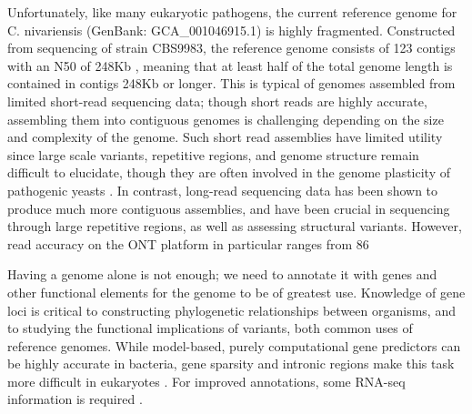 Unfortunately, like many eukaryotic pathogens, the current reference genome for C. nivariensis (GenBank: GCA\_001046915.1) is highly fragmented. Constructed from sequencing of strain CBS9983, the reference genome consists of 123 contigs with an N50 of 248Kb \citep{Gabaldon2013-bk}, meaning that at least half of the total genome length is contained in contigs 248Kb or longer. This is typical of genomes assembled from limited short-read sequencing data; though short reads are highly accurate, assembling them into contiguous genomes is challenging depending on the size and complexity of the genome. Such short read assemblies have limited utility since large scale variants, repetitive regions, and genome structure remain difficult to elucidate, though they are often involved in the genome plasticity of pathogenic yeasts \citep{Carrete2018-xm}. In contrast, long-read sequencing data has been shown to produce much more contiguous assemblies, and have been crucial in sequencing through large repetitive regions, as well as assessing structural variants. However, read accuracy on the ONT platform in particular ranges from 86%

Having a genome alone is not enough; we need to annotate it with genes and other functional elements for the genome to be of greatest use. Knowledge of gene loci is critical to constructing phylogenetic relationships between organisms, and to studying the functional implications of variants, both common uses of reference genomes. While model-based, purely computational gene predictors can be highly accurate in bacteria, gene sparsity and intronic regions make this task more difficult in eukaryotes \citep{Salzberg2019-hw}. For improved annotations, some RNA-seq information is required \citep{Salzberg2019-hw}.

